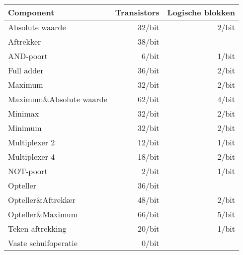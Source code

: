 \begin{tabular}{l|rr}
Component&Transistors&Logische blokken\\\hline
Absolute waarde&32/bit&2/bit\\
Aftrekker&38/bit&\\
AND-poort&6/bit&1/bit\\
Full adder&36/bit&2/bit\\
Maximum&32/bit&2/bit\\
Maximum\&Absolute waarde&62/bit&4/bit\\
Minimax&32/bit&2/bit\\
Minimum&32/bit&2/bit\\
Multiplexer 2&12/bit&1/bit\\
Multiplexer 4&18/bit&2/bit\\
NOT-poort&2/bit&1/bit\\
Opteller&36/bit&\\
Opteller\&Aftrekker&48/bit&2/bit\\
Opteller\&Maximum&66/bit&5/bit\\
Teken aftrekking&20/bit&1/bit\\
Vaste schuifoperatie&0/bit&\\
\end{tabular}